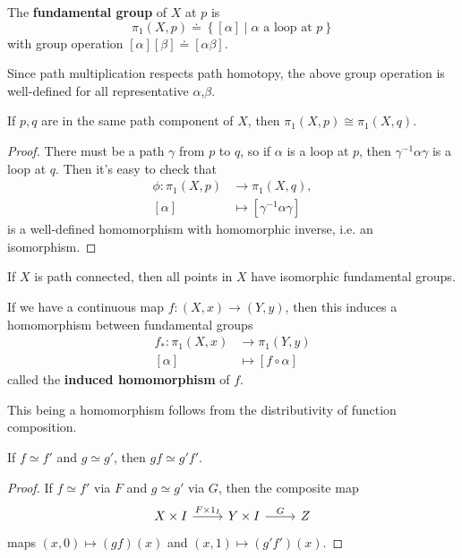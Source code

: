 \documentclass[twoside,10pt]{report}
\begin{document}
\begin{defn}[]
	The \textbf{fundamental group} of $X$ at $p$ is
	\[
		\pi_1(X,p) \doteq \left\{ [\alpha] \;|\; \alpha \text{ a loop at } p \right\}
	\] 
	with group operation
	$
		[\alpha][\beta] \doteq [\alpha \beta].
	$ 
\end{defn}

Since path multiplication respects path homotopy, the above group operation is well-defined for all representative $\alpha$,$\beta$.

\begin{prop}
	If $p,q$ are in the same path component of $X$, then $\pi_1(X,p) \cong \pi_1(X,q)$.
\end{prop}
\begin{proof}
	There must be a path $\gamma$ from $p$ to $q$, so if $\alpha$ is a loop at $p$, then $\gamma^{-1}\alpha\gamma$ is a loop at $q$. Then it's easy to check that
	\begin{align*}
		\phi:\pi_1(X,p)&\to \pi_1(X,q),\\
		[\alpha]&\mapsto [\gamma^{-1}\alpha\gamma]
	\end{align*}
	is a well-defined homomorphism with homomorphic inverse, i.e. an isomorphism.
\end{proof}

\begin{cor}
If $X$ is path connected, then all points in $X$ have isomorphic fundamental groups.
\end{cor}

\begin{defn}[]
If we have a continuous map $f:(X,x)\to (Y,y)$, then this induces a homomorphism between fundamental groups
\begin{align*}
	f_{*}:\pi_1(X,x)&\to \pi_1(Y,y)\\
	[\alpha]&\mapsto [f\circ \alpha]
\end{align*}
called the \textbf{induced homomorphism} of $f$.
\end{defn}
This being a homomorphism follows from the distributivity of function composition.

\begin{prop}
If $f \simeq f'$ and $g \simeq g'$, then $gf \simeq g'f'$.
\end{prop}
\begin{proof}
If $f \simeq f'$ via $F$ and $g \simeq g'$ via $G$, then the composite map
\[
\begin{tikzcd}
	X\times I\rar{F\times 1_{I}} & Y\times I \rar{G} & Z
\end{tikzcd}
\] 
maps $(x,0) \mapsto (gf)(x)$ and $(x,1)\mapsto (g'f')(x)$.
\end{proof}
\end{document}
